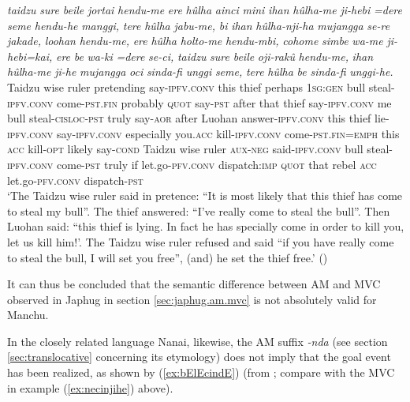 \documentclass{article}
\newcommand{\ipa}[1]{\textit{{\phon\mbox{#1}}}} %
\begin{document}
\begin{exe}
\ex \label{ex:huulhanjiha}
\gll
\ipa{taidzu} 	\ipa{sure} 	\ipa{beile} 	\ipa{jortai} 	\ipa{hendu-me} 	\ipa{ere} 	\ipa{hûlha} 	\ipa{ainci} 	\ipa{mini} 	\ipa{ihan} 	\ipa{hûlha-me} 	\ipa{ji-hebi} 	\ipa{=dere} 	\ipa{seme} 	\ipa{hendu-he} 	\ipa{manggi,} 	\ipa{tere} 	\ipa{hûlha} 	\ipa{jabu-me,} 	\ipa{bi} 	\ipa{ihan} 	\ipa{hûlha-nji-ha} 	\ipa{mujangga} 	\ipa{se-re} 	\ipa{jakade,} 	\ipa{loohan} 	\ipa{hendu-me,} 	\ipa{ere} 	\ipa{hûlha} 	\ipa{holto-me} 	\ipa{hendu-mbi,} 	\ipa{cohome} 	\ipa{simbe} 	\ipa{wa-me} 	\ipa{ji-hebi=kai,} 	\ipa{ere} 	\ipa{be} 	\ipa{wa-ki} 	\ipa{=dere} 	\ipa{se-ci,} 	\ipa{taidzu} 	\ipa{sure} 	\ipa{beile} 	\ipa{oji-rakû} 	\ipa{hendu-me,} 	\ipa{ihan} 	\ipa{hûlha-me} 	\ipa{ji-he} 	\ipa{mujangga} 	\ipa{oci} 	\ipa{sinda-fi} 	\ipa{unggi} 	\ipa{seme,} 	\ipa{tere} 	\ipa{hûlha} 	\ipa{be} 	\ipa{sinda-fi} 	\ipa{unggi-he.} \\
Taidzu wise ruler pretending say-\textsc{ipfv.conv} this thief perhaps \textsc{1sg:gen} bull steal-\textsc{ipfv.conv} come-\textsc{pst.fin} probably \textsc{quot} say-\textsc{pst} after that thief say-\textsc{ipfv.conv} me bull steal-\textsc{cisloc-pst} truly say-\textsc{aor} after Luohan answer-\textsc{ipfv.conv} this thief lie-\textsc{ipfv.conv} say-\textsc{ipfv.conv} especially you.\textsc{acc} kill-\textsc{ipfv.conv} come-\textsc{pst.fin}=\textsc{emph} this \textsc{acc} kill-\textsc{opt} likely say-\textsc{cond} Taidzu wise ruler \textsc{aux-neg} said-\textsc{ipfv.conv} bull steal-\textsc{ipfv.conv} come-\textsc{pst} truly if let.go-\textsc{pfv.conv} dispatch:\textsc{imp} \textsc{quot} that rebel \textsc{acc} let.go-\textsc{pfv.conv} dispatch-\textsc{pst} \\
\glt  `The Taidzu wise ruler said in pretence: “It is most likely that this thief has come to steal my bull”. The thief answered: “I’ve really come to steal the bull”. Then Luohan said: “this thief is lying. In fact he has specially come in order to kill you, let us kill him!’. The Taidzu wise ruler refused and said “if you have really come to steal the bull, I will set you free”, (and) he set the thief free.' (\citealt[35;171-172]{shunjuu92yargiyan})
\end{exe}


It can thus be concluded that the semantic difference between AM and MVC observed in Japhug in section \ref{sec:japhug.am.mvc} is not absolutely valid for Manchu.

In the closely related language Nanai, likewise, the AM suffix  \ipa{-nda} (see section \ref{sec:translocative} concerning its etymology) does not imply that the goal event has been realized, as shown by (\ref{ex:bElEcindE}) (from \citealt[89]{stojnova16nda}; compare with the MVC in example (\ref{ex:necinjihe}) above).
\end{document}

